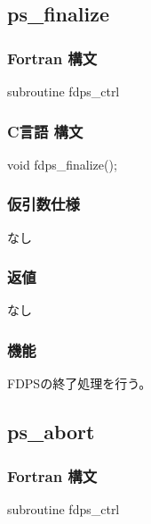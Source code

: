 \subsection{ps\_finalize}
\subsubsection*{Fortran 構文}
\begin{screen}
\begin{spverbatim}
subroutine fdps_ctrl%
\end{spverbatim}
\end{screen}

\subsubsection*{C言語 構文}
\begin{screen}
\begin{spverbatim}
void fdps_finalize();
\end{spverbatim}
\end{screen}

\subsubsection*{仮引数仕様} 
なし
\subsubsection*{返値}
なし
\subsubsection*{機能}
FDPSの終了処理を行う。
\clearpage

\subsection{ps\_abort}
\subsubsection*{Fortran 構文}
\begin{screen}
\begin{spverbatim}
subroutine fdps_ctrl%
\end{spverbatim}
\end{screen}

